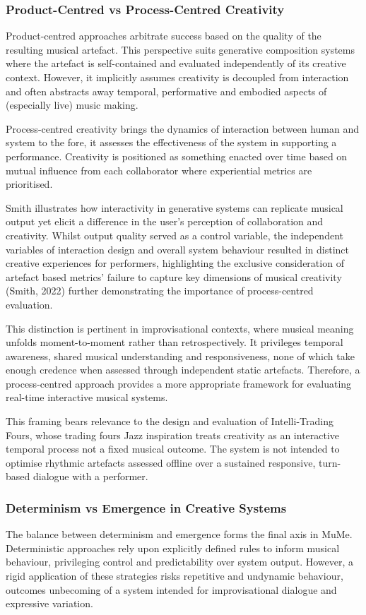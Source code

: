 \documentclass[11pt,a4paper]{article}
\begin{document}
\subsubsection{Product-Centred vs Process-Centred Creativity}
Product-centred approaches arbitrate success based on the quality of the resulting musical artefact. This perspective suits generative composition systems where the artefact is self-contained and evaluated independently of its creative context. However, it implicitly assumes creativity is decoupled from interaction and often abstracts away temporal, performative and embodied aspects of (especially live) music making. 

Process-centred creativity brings the dynamics of interaction between human and system to the fore, it assesses the effectiveness of the system in supporting a performance. Creativity is positioned as something enacted over time based on mutual influence from each collaborator where experiential metrics are prioritised. 

Smith illustrates how interactivity in generative systems can replicate musical output yet elicit a difference in the user’s perception of collaboration and creativity. Whilst output quality served as a control variable, the independent variables of interaction design and overall system behaviour resulted in distinct creative experiences for performers, highlighting the exclusive consideration of artefact based metrics’ failure to capture key dimensions of musical creativity (Smith, 2022) further demonstrating the importance of process-centred evaluation.

This distinction is pertinent in improvisational contexts, where musical meaning unfolds moment-to-moment rather than retrospectively. It privileges temporal awareness, shared musical understanding and responsiveness, none of which take enough credence when assessed through independent static artefacts. Therefore, a process-centred approach provides a more appropriate framework for evaluating real-time interactive musical systems.

This framing bears relevance to the design and evaluation of Intelli-Trading Fours, whose trading fours Jazz inspiration treats creativity as an interactive temporal process not a fixed musical outcome. The system is not intended to optimise rhythmic artefacts assessed offline over a sustained responsive, turn-based dialogue with a performer. 

\subsubsection{Determinism vs Emergence in Creative Systems}
The balance between determinism and emergence forms the final axis in MuMe. Deterministic approaches rely upon explicitly defined rules to inform musical behaviour, privileging control and predictability over system output. However, a rigid application of these strategies risks repetitive and undynamic behaviour, outcomes unbecoming of a system intended for improvisational dialogue and expressive variation.
\end{document}
